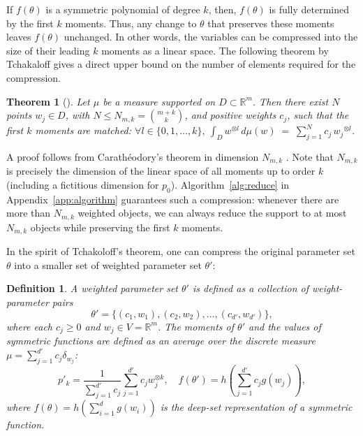 \documentclass{article}
\theoremstyle{plain}
\newtheorem{theorem}{Theorem}
\newtheorem{definition}{Definition}
\def\REV#1{{\color[HTML]{000000}#1}}
\begin{document}
If $f(\theta)$ is a symmetric polynomial of degree $k$, then, $f(\theta)$ is fully determined by the first $k$ moments. Thus, any change to $\theta$ that preserves these moments leaves $f(\theta)$ unchanged. In other words, the variables can be compressed into the size of their leading $k$ moments as a linear space. The following theorem by Tchakaloff gives a direct upper bound on the number of elements required for the compression.

\begin{theorem}[\cite{tchakaloff1957formules}]\label{thm:tchakaloff}
    Let $\mu$ be a measure supported on $D \subset \mathbb{R}^m$. Then there exist $N$ points $w_j \in D$, with $N \leq N_{m,k} = \binom{m+k}{k}$, and positive weights $c_j$, such that the first $k$ moments are matched: $\forall l \in\{0,1,\dots,k\},\ \int_D w^{\otimes l}\, d\mu(w) \;=\; \sum_{j=1}^N c_j \,{w_j}^{\otimes l}$.
\end{theorem}

A proof follows from Carathéodory's theorem in dimension $N_{m,k}$ \citep{leonard2015geometry}. Note that $N_{m,k}$ is precisely the dimension of the linear space of all moments up to order $k$ (including a fictitious dimension for $p_0$). 
Algorithm~\ref{alg:reduce} in Appendix~\ref{app:algorithm} guarantees such a compression: whenever there are more than $N_{m,k}$ weighted objects, \REV{we} can always reduce the support to at most $N_{m,k}$ objects while preserving the first $k$ moments.



In the spirit of Tchakoloff's theorem, one can compress the original parameter set $\theta$ into a smaller set of  weighted parameter set $\theta'$:

\begin{definition}
    A weighted parameter set $\theta'$ is defined as a collection of weight-parameter pairs
    \begin{equation}
        \theta' = \{ (c_1, w_1), (c_2, w_2), \dots, (c_{d'}, w_{d'}) \} ,
    \end{equation}
    where each $c_j\geq 0$ and $w_j\in V = \mathbb{R}^m$. The moments of $\theta'$ and the values of symmetric functions are defined as an average over the discrete measure $\mu = \sum_{j=1}^{d'} c_j \delta_{w_j}$:
    \begin{equation}
        p'_k = \frac{1}{\sum_{j=1}^{d'} c_j} \sum_{j=1}^{d'} c_j w_j^{\otimes k} , \quad
        f(\theta') = h \left( \sum_{j=1}^{d'} c_j g(w_j) \right)  ,
    \end{equation}
    where $f(\theta) = h (\sum_{i=1}^d g(w_i))$ is the deep-set representation of a symmetric function. 
\end{definition}
\end{document}
